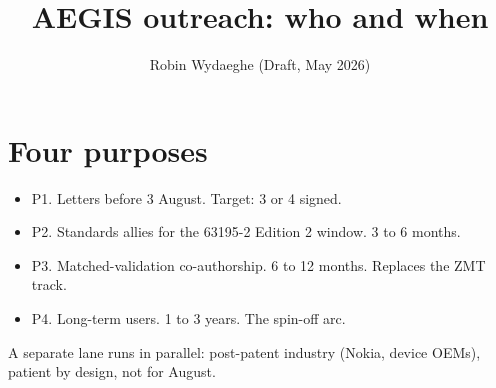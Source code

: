 \documentclass[11pt,a4paper]{article}
\title{\vspace{-1.5em}AEGIS outreach: who and when}
\author{Robin Wydaeghe \quad (Draft, May 2026)}
\date{}
\begin{document}
\maketitle
\vspace{-2em}

\section{Four purposes}
\begin{itemize}
  \item P1. Letters before 3 August. Target: 3 or 4 signed.
  \item P2. Standards allies for the 63195-2 Edition 2 window. 3 to 6 months.
  \item P3. Matched-validation co-authorship. 6 to 12 months. Replaces the ZMT track.
  \item P4. Long-term users. 1 to 3 years. The spin-off arc.
\end{itemize}

A separate lane runs in parallel: post-patent industry (Nokia, device OEMs), patient by design, not for August.
\end{document}
